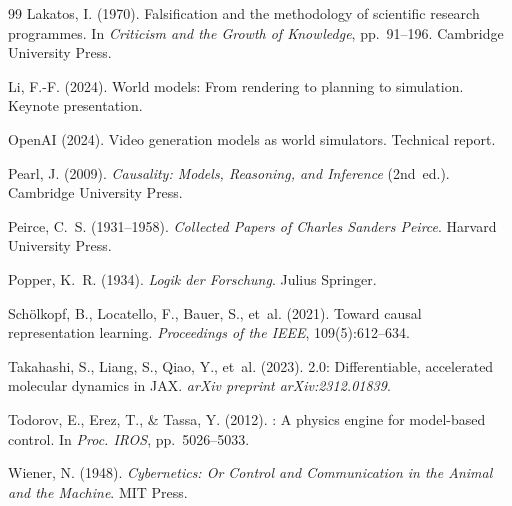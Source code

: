 \documentclass[11pt,a4paper]{article}
\begin{document}
\begin{thebibliography}{99}
Lakatos, I. (1970).
\newblock Falsification and the methodology of scientific research programmes.
\newblock In \emph{Criticism and the Growth of Knowledge}, pp.~91--196. Cambridge University Press.

Li, F.-F. (2024).
\newblock World models: From rendering to planning to simulation.
\newblock Keynote presentation.

OpenAI (2024).
\newblock Video generation models as world simulators.
\newblock Technical report.

Pearl, J. (2009).
\newblock \emph{Causality: Models, Reasoning, and Inference} (2nd~ed.).
\newblock Cambridge University Press.

Peirce, C.~S. (1931--1958).
\newblock \emph{Collected Papers of Charles Sanders Peirce}.
\newblock Harvard University Press.

Popper, K.~R. (1934).
\newblock \emph{Logik der Forschung}.
\newblock Julius Springer.

Sch{\"o}lkopf, B., Locatello, F., Bauer, S., et~al. (2021).
\newblock Toward causal representation learning.
\newblock \emph{Proceedings of the IEEE}, 109(5):612--634.

Takahashi, S., Liang, S., Qiao, Y., et~al. (2023).
 2.0: Differentiable, accelerated molecular dynamics in {JAX}.
\newblock \emph{arXiv preprint arXiv:2312.01839}.

Todorov, E., Erez, T., \& Tassa, Y. (2012).
: A physics engine for model-based control.
\newblock In \emph{Proc. IROS}, pp.~5026--5033.

Wiener, N. (1948).
\newblock \emph{Cybernetics: Or Control and Communication in the Animal and the Machine}.
\newblock MIT Press.

\end{thebibliography}
\end{document}
